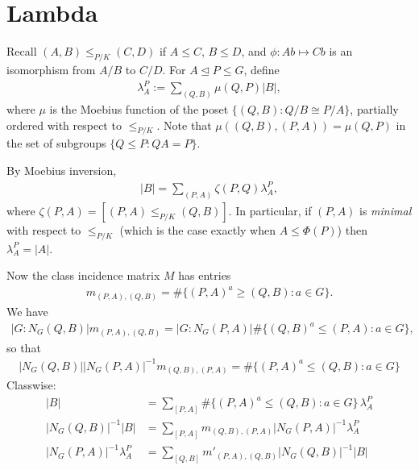 \documentclass[12pt,a4paper]{amsart}
\newcommand{\Size}[1]{\left|#1\right|}
\begin{document}
\section{Lambda}

Recall $(A, B) \leq_{P/K} (C, D)$ if
$A \leq C$, $B \leq D$, and $\phi \colon Ab \mapsto Cb$ is an isomorphism
from $A/B$ to $C/D$.
For $A \unlhd P \leq G$, define
\begin{align*}
  \lambda^P_A := \sum_{(Q, B)} \mu (Q, P) \Size{B},
\end{align*}
where $\mu$ is the Moebius function of the poset
$\{ (Q, B) : Q/B \cong P/A \}$, partially ordered with respect to
$\leq_{P/K}$. Note that $\mu((Q, B), (P, A)) = \mu(Q, P)$ in the
set of subgroups $\{Q \leq P : QA = P \}$.

By Moebius inversion,
\begin{align*}
  \Size{B} = \sum_{(P, A)} \zeta(P, Q) \lambda^P_A,
\end{align*}
where $\zeta(P, A) = [(P, A) \leq_{P/K} (Q, B)]$.
In particular, if $(P, A)$ is \emph{minimal} with respect to $\leq_{P/K}$
(which is the case exactly when $A \leq \Phi(P)$) then
$\lambda^P_A = \Size{A}$.

Now the class incidence matrix $M$ has entries
\begin{align*}
  m_{(P, A), (Q, B)} = \# \{ (P, A)^a \geq (Q, B) : a \in G \}.
\end{align*}
We have
\begin{align*}
  \Size{G: N_G(Q, B)} m_{(P, A), (Q, B)} =
  \Size{G: N_G(P, A)}  \# \{ (Q, B)^a \leq (P, A) : a \in G \},
\end{align*}
so that
\begin{align*}
  \Size{N_G(Q, B)} \Size{N_G(P, A)}^{-1} m_{(Q, B), (P, A)} =  \# \{ (P, A)^a \leq (Q, B) : a \in G \}
\end{align*}
Classwise:
\begin{align*}
  \Size{B} &= \sum_{[P, A]} \# \{ (P, A)^a \leq (Q, B) : a \in G \}\, \lambda^P_A \\
\Size{N_G(Q, B)}^{-1} \Size{B}  &= \sum_{[P, A]} m_{(Q, B), (P, A)} \Size{N_G(P, A)}^{-1}  \lambda^P_A \\
\Size{N_G(P, A)}^{-1}  \lambda^P_A  &= \sum_{[Q, B]} m'_{(P, A), (Q, B)} \Size{N_G(Q, B)}^{-1} \Size{B}  \\
\end{align*}
\end{document}
